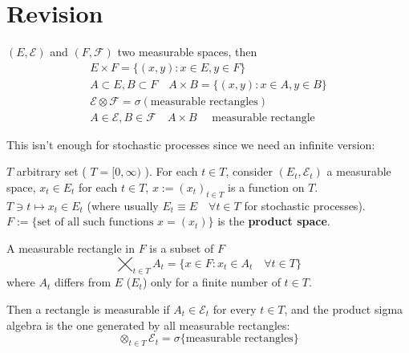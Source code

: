 \section*{Revision}
\begin{DefBox}
    \begin{Def}
    $(E, \mathcal{E})$ and $(F, \mathcal{F})$ two measurable spaces, then 
    \begin{equation*}
        \begin{split}
        E \times F = \{(x,y): x \in E, y \in F\}\\
        A \subset E, B \subset F \quad A \times B = \{(x,y): x \in A, y \in B\}   \\    
        \mathcal{E}\otimes  \mathcal{F} = \sigma(\text{measurable rectangles})\\
        A \in \mathcal{E}, B\in \mathcal{F} \quad A\times B  \quad \text{ measurable rectangle}
        \end{split}     
    \end{equation*}
\end{Def}
\end{DefBox}
This isn't enough for stochastic processes since we need an infinite version:
\begin{DefBox}
    \begin{Def}
    $T$ arbitrary set ( $T=[0, \infty)$ ). For each $t \in T$, consider $(E_t, \mathcal{E}_t)$ a measurable space, $x_t \in E_t$ for each $t\in T$, $x:=(x_t)_{t \in T}$ is a function on $T$. \\
    $T \owns t \mapsto x_t \in E_t$ (where usually $E_t \equiv E \quad \forall t \in T$ for stochastic processes).\\
    $F:=\{\text{set of all such functions  } x = (x_t)\}$ is the \textbf{product space}.
\end{Def}
\end{DefBox}

\begin{DefBox}
    \begin{Def}
    A measurable rectangle in $F$ is a subset of $F$
    \begin{equation*}
        \bigtimes_{t \in T} A_t =\{x \in F: x_t\in A_t \quad \forall t \in T\}
    \end{equation*}
    where $A_t$ differs from $E$ ($E_t$) only for a finite number of $t \in T$.
\end{Def}
\end{DefBox}
Then a rectangle is measurable if $A_t \in \mathcal{E}_t$ for every $t \in T$, and the product sigma algebra is the one generated by all measurable rectangles:
\begin{equation*}
    \otimes_{t \in T} \mathcal{E}_t =\sigma \{\text{measurable rectangles}\}
\end{equation*}
